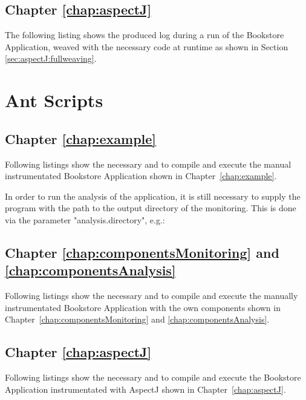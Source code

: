 	\subsection{Chapter \ref{chap:aspectJ}}
	    The following listing shows the produced log during a run of the Bookstore Application, weaved with the necessary code at runtime as shown in Section \ref{sec:aspectJ:fullweaving}.
		
	
\newpage
  \section{Ant Scripts}
    \subsection{Chapter \ref{chap:example}}
      Following listings show the necessary  and  to compile and execute the manual instrumentated Bookstore Application shown in Chapter~\ref{chap:example}.
      \setXMLListing
      
      
      In order to run the analysis of the application, it is still necessary to supply the program with the path to the output directory of the monitoring. This is done via the parameter "analysis.directory", e.g.:
      \setBashListing
      

    \subsection{Chapter \ref{chap:componentsMonitoring} and \ref{chap:componentsAnalysis}}
      Following listings show the necessary  and  to compile and execute the manually instrumentated Bookstore Application with the own components shown in Chapter~\ref{chap:componentsMonitoring} and \ref{chap:componentsAnalysis}.
      \setXMLListing
      
      

    \subsection{Chapter \ref{chap:aspectJ}}
      Following listings show the necessary  and  to compile and execute the Bookstore Application instrumentated with AspectJ shown in Chapter~\ref{chap:aspectJ}.
      \setXMLListing
      
           

